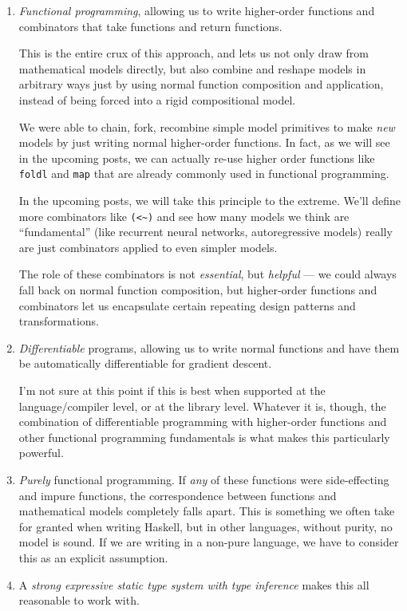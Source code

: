 \documentclass[]{article}
\begin{document}
\begin{enumerate}
\def\labelenumi{\arabic{enumi}.}
\item
  \emph{Functional programming}, allowing us to write higher-order functions and
  combinators that take functions and return functions.

  This is the entire crux of this approach, and lets us not only draw from
  mathematical models directly, but also combine and reshape models in arbitrary
  ways just by using normal function composition and application, instead of
  being forced into a rigid compositional model.

  We were able to chain, fork, recombine simple model primitives to make
  \emph{new} models by just writing normal higher-order functions. In fact, as
  we will see in the upcoming posts, we can actually re-use higher order
  functions like \texttt{foldl} and \texttt{map} that are already commonly used
  in functional programming.

  In the upcoming posts, we will take this principle to the extreme. We'll
  define more combinators like \texttt{(\textless{}\textasciitilde{})} and see
  how many models we think are ``fundamental'' (like recurrent neural networks,
  autoregressive models) really are just combinators applied to even simpler
  models.

  The role of these combinators is not \emph{essential}, but \emph{helpful} ---
  we could always fall back on normal function composition, but higher-order
  functions and combinators let us encapsulate certain repeating design patterns
  and transformations.
\item
  \emph{Differentiable} programs, allowing us to write normal functions and have
  them be automatically differentiable for gradient descent.

  I'm not sure at this point if this is best when supported at the
  language/compiler level, or at the library level. Whatever it is, though, the
  combination of differentiable programming with higher-order functions and
  other functional programming fundamentals is what makes this particularly
  powerful.
\item
  \emph{Purely} functional programming. If \emph{any} of these functions were
  side-effecting and impure functions, the correspondence between functions and
  mathematical models completely falls apart. This is something we often take
  for granted when writing Haskell, but in other languages, without purity, no
  model is sound. If we are writing in a non-pure language, we have to consider
  this as an explicit assumption.
\item
  A \emph{strong expressive static type system with type inference} makes this
  all reasonable to work with.


\end{enumerate}
\end{document}
